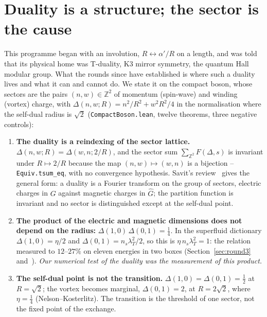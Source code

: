 \documentclass[11pt,a4paper]{article}
\newcommand{\lean}[1]{\texttt{\small #1}}
\begin{document}
\section{Duality is a structure; the sector is the cause}\label{sec:duality}

This programme began with an involution, $R\leftrightarrow\alpha'/R$ on a length, and was told that its
physical home was T-duality, K3 mirror symmetry, the quantum Hall modular group. What the rounds since have
established is where such a duality lives and what it can and cannot do. We state it on the compact boson, whose
sectors are the pairs $(n,w)\in\mathbb Z^2$ of momentum (spin-wave) and winding (vortex) charge, with
$\Delta(n,w;R)=n^2/R^2+w^2R^2/4$ in the normalisation where the self-dual radius is $\sqrt2$
(\lean{CompactBoson.lean}, twelve theorems, three negative controls):
\begin{enumerate}[leftmargin=*]
\item \textbf{The duality is a reindexing of the sector lattice.} $\Delta(n,w;R)=\Delta(w,n;2/R)$, and the sector
  sum $\sum_{\mathbb Z^2}F(\Delta,s)$ is invariant under $R\mapsto2/R$ because the map $(n,w)\mapsto(w,n)$ is a
  bijection -- \lean{Equiv.tsum\_eq}, with no convergence hypothesis. Savit's review~\cite{Savit1980} gives the general form: a
  duality is a Fourier transform on the group of sectors, electric charges in $G$ against magnetic charges in
  $\hat G$; the partition function is invariant and no sector is distinguished except at the self-dual point.
\item \textbf{The product of the electric and magnetic dimensions does not depend on the radius:}
  $\Delta(1,0)\,\Delta(0,1)=\tfrac14$. In the superfluid dictionary $\Delta(1,0)=\eta/2$ and
  $\Delta(0,1)=n_s\lambda_T^2/2$, so this is $\eta\,n_s\lambda_T^2=1$: the relation measured to $12$--$27\%$ on
  eleven energies in two boxes (Section~\ref{sec:round3} and~\cite{Callens2026Causal}). \emph{Our numerical test
  of the duality was the measurement of this product.}
\item \textbf{The self-dual point is not the transition.} $\Delta(1,0)=\Delta(0,1)=\tfrac12$ at $R=\sqrt2$; the
  vortex becomes marginal, $\Delta(0,1)=2$, at $R=2\sqrt2$, where $\eta=\tfrac14$ (Nelson--Kosterlitz). The
  transition is the threshold of one sector, not the fixed point of the exchange.
\end{enumerate}
\end{document}
